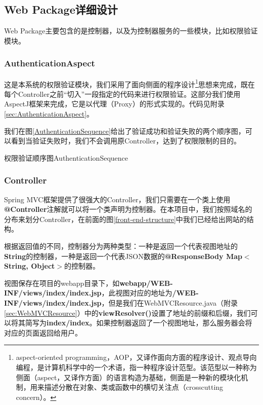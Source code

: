 \subsection{Web Package详细设计}
Web Package主要包含的是控制器，以及为控制器服务的一些模块，比如权限验证模块。

\subsubsection{AuthenticationAspect}
这是本系统的权限验证模块，我们采用了面向侧面的程序设计\footnote{aspect-oriented programming，AOP，又译作面向方面的程序设计、观点导向编程，是计算机科学中的一个术语，指一种程序设计范型。该范型以一种称为侧面（aspect，又译作方面）的语言构造为基础，侧面是一种新的模块化机制，用来描述分散在对象、类或函数中的横切关注点（crosscutting concern）。}思想来完成，既在每个Controller之前``切入''一段指定的代码来进行权限验证。这部分我们使用AspectJ框架来完成，它是以代理（Proxy）的形式实现的。代码见附录\ref{sec:AuthenticationAspect}。

我们在图\ref{AuthenticationSequence}给出了验证成功和验证失败的两个顺序图，可以看到当验证失败时，我们不会调用原Controller，达到了权限限制的目的。

\begin{pics}[htbp]{权限验证顺序图}{AuthenticationSequence}
\end{pics}

\subsubsection{Controller}
Spring MVC框架提供了很强大的Controller，我们只需要在一个类上使用\textbf{@Controller}注解就可以将一个类声明为控制器。在本项目中，我们按照域名的分布来划分Controller，在前面的图\ref{front-end-structure}中我们已经给出网站的结构。

根据返回值的不同，控制器分为两种类型：一种是返回一个代表视图地址的\textbf{String}的控制器，一种是返回一个代表JSON数据的\textbf{@ResponseBody Map$<$String, Object$>$}的控制器。

视图保存在项目的webapp目录下，如\textbf{webapp/WEB-INF/views/index/index.jsp}，此视图对应的地址为\textbf{/WEB-INF/views/index/index.jsp}，但是我们在WebMVCResource.java（附录\ref{sec:WebMVCResource}）中的\textbf{viewResolver()}设置了地址的前缀和后缀，我们可以将其简写为\textbf{index/index}。如果控制器返回了一个视图地址，那么服务器会将对应的页面返回给用户。

